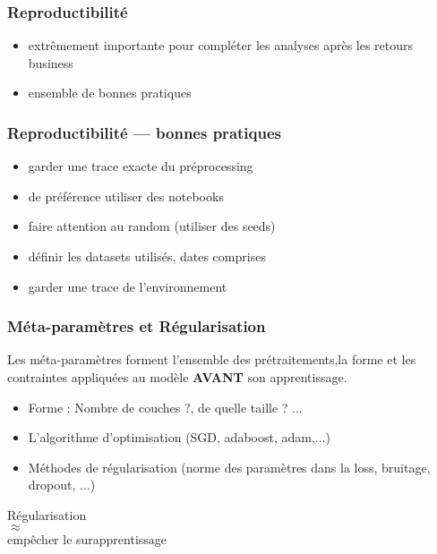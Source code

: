 \documentclass{formation}
\begin{document}
\begin{frame}
  \frametitle{Reproductibilité}
  \begin{itemize}
  \item extrêmement importante pour compléter les analyses après les retours business
  \item ensemble de bonnes pratiques
  \end{itemize}
\end{frame}

\begin{frame}
  \frametitle{Reproductibilité — bonnes pratiques}
  \begin{itemize}[<+->]
  \item garder une trace exacte du préprocessing
  \item de préférence utiliser des notebooks
  \item faire attention au random (utiliser des seeds)
  \item définir les datasets utilisés, dates comprises
  \item garder une trace de l'environnement
  \end{itemize}
\end{frame}

\begin{frame}
  \frametitle{Méta-paramètres et Régularisation}
  Les méta-paramètres forment l'ensemble des prétraitements,la forme et les contraintes appliquées au modèle \textbf{AVANT} son apprentissage.
  \begin{itemize}
  \item Forme : Nombre de couches ?, de quelle taille ? ...
  \item L'algorithme d'optimisation (SGD, adaboost, adam,...)
  \item Méthodes de régularisation (norme des paramètres dans la loss, bruitage, dropout, ...)
  \end{itemize}
  \begin{minipage}[l]{0.49\linewidth}
    \begin{center}
      Régularisation \\
      $\approx$\\
      empêcher le surapprentissage
    \end{center}
  \end{minipage}\hfill
  \begin{minipage}[l]{0.49\linewidth}
  \end{minipage}\hfill
\end{frame}
\end{document}
